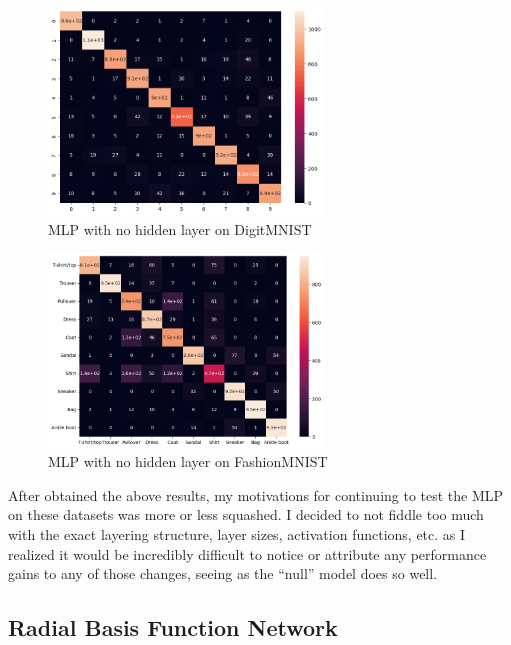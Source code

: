 \documentclass[12pt, twoside]{report}
\begin{document}
\begin{figure}[H]
    \centering
    \includegraphics[width=0.65\textwidth]{figures/mlp_no_hidden_cf.png}
    \caption*{MLP with no hidden layer on DigitMNIST}
\end{figure}

\begin{figure}[H]
    \centering
    \includegraphics[width=0.65\textwidth]{figures/mlp_no_hidden_cf_fashion.png}
    \caption*{MLP with no hidden layer on FashionMNIST}
\end{figure}

After obtained the above results, my motivations for continuing to test the MLP on these datasets
was more or less squashed. I decided to not fiddle too much with the exact layering structure, layer sizes,
activation functions, etc. as I realized it would be incredibly difficult to notice or attribute any 
performance gains to any of those changes, seeing as the ``null'' model does so well.

\subsection{Radial Basis Function Network}
\end{document}
